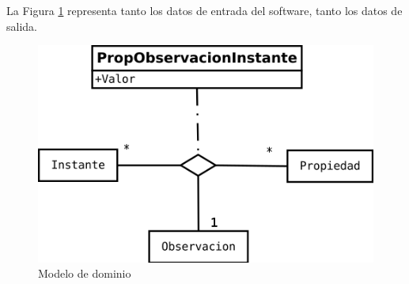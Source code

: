 La Figura \ref{fig:ModelodeDominio} representa tanto los datos de entrada del software, tanto los datos
de salida.

\begin{figure}[h]
\centering
\includegraphics[width=0.7\linewidth]{./Figures/ModelodeDominio}
\caption[Modelo de dominio]{Modelo de dominio}
\label{fig:ModelodeDominio}
\end{figure}
